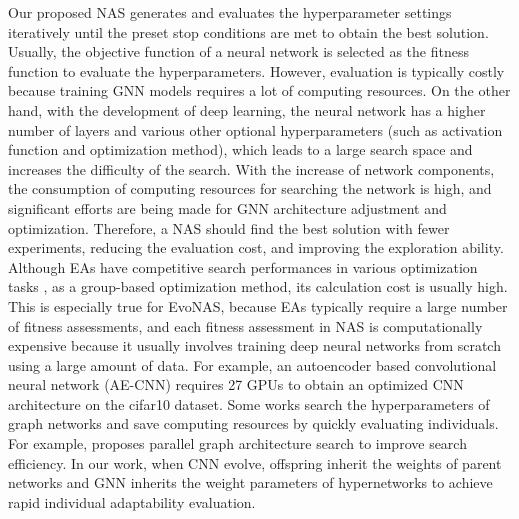 \documentclass[lettersize,journal]{IEEEtran}
\begin{document}
Our proposed NAS generates and evaluates the hyperparameter settings iteratively until the preset stop conditions are met to obtain the best solution. Usually, the objective function of a neural network is selected as the fitness function to evaluate the hyperparameters. However, evaluation is typically costly  because training GNN models requires a lot of computing resources. On the other hand, with the development of deep learning, the neural network has a higher number of layers and various other optional hyperparameters (such as activation function and optimization method), which leads to a large search space and increases the difficulty of the search. With the increase of network components, the consumption of computing resources for searching the network is high, and significant efforts are being made for GNN architecture adjustment and optimization. Therefore, a NAS should find the best solution with fewer experiments, reducing the evaluation cost, and improving the exploration ability. Although EAs have competitive search performances in various optimization tasks \cite{38}, as a group-based optimization method, its calculation cost is usually high. This is especially true for EvoNAS, because EAs typically require a large number of fitness assessments, and each fitness assessment in NAS is computationally expensive because it usually involves training deep neural networks from scratch using a large amount of data. For example, an autoencoder based convolutional neural network (AE-CNN) requires 27 GPUs to obtain an optimized CNN architecture on the cifar10 dataset. Some works search the hyperparameters of graph networks and save computing resources by quickly evaluating individuals. For example, \cite{39} proposes parallel graph architecture search to improve search efficiency. In our work, when CNN evolve, offspring inherit the weights of parent networks and GNN inherits the weight parameters of hypernetworks to achieve rapid individual adaptability evaluation.
\end{document}
